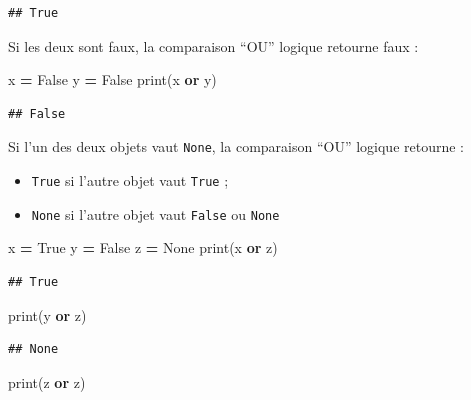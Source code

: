 \documentclass[12pt,]{book}
\newenvironment{Shaded}{\begin{snugshade}}{\end{snugshade}}
\newcommand{\KeywordTok}[1]{\textcolor[rgb]{0.13,0.29,0.53}{\textbf{#1}}}
\newcommand{\VariableTok}[1]{\textcolor[rgb]{0.00,0.00,0.00}{#1}}
\newcommand{\OperatorTok}[1]{\textcolor[rgb]{0.81,0.36,0.00}{\textbf{#1}}}
\newcommand{\BuiltInTok}[1]{#1}
\newcommand{\NormalTok}[1]{#1}
\providecommand{\tightlist}{%
  \setlength{\itemsep}{0pt}\setlength{\parskip}{0pt}}
\numberwithin{equation}{section}
\numberwithin{countremarque}{section}
\begin{document}
\begin{lstlisting}
## True
\end{lstlisting}

Si les deux sont faux, la comparaison ``OU'' logique retourne faux :

\begin{Shaded}
\begin{Highlighting}[]
\NormalTok{x }\OperatorTok{=} \VariableTok{False}
\NormalTok{y }\OperatorTok{=} \VariableTok{False}
\BuiltInTok{print}\NormalTok{(x }\KeywordTok{or}\NormalTok{ y)}
\end{Highlighting}
\end{Shaded}

\begin{lstlisting}
## False
\end{lstlisting}

Si l'un des deux objets vaut \texttt{None}, la comparaison ``OU''
logique retourne :

\begin{itemize}
\tightlist
\item
  \texttt{True} si l'autre objet vaut \texttt{True} ;
\item
  \texttt{None} si l'autre objet vaut \texttt{False} ou \texttt{None}
\end{itemize}

\begin{Shaded}
\begin{Highlighting}[]
\NormalTok{x }\OperatorTok{=} \VariableTok{True}
\NormalTok{y }\OperatorTok{=} \VariableTok{False}
\NormalTok{z }\OperatorTok{=} \VariableTok{None}
\BuiltInTok{print}\NormalTok{(x }\KeywordTok{or}\NormalTok{ z)}
\end{Highlighting}
\end{Shaded}

\begin{lstlisting}
## True
\end{lstlisting}

\begin{Shaded}
\begin{Highlighting}[]
\BuiltInTok{print}\NormalTok{(y }\KeywordTok{or}\NormalTok{ z)}
\end{Highlighting}
\end{Shaded}

\begin{lstlisting}
## None
\end{lstlisting}

\begin{Shaded}
\begin{Highlighting}[]
\BuiltInTok{print}\NormalTok{(z }\KeywordTok{or}\NormalTok{ z)}
\end{Highlighting}
\end{Shaded}
\end{document}
